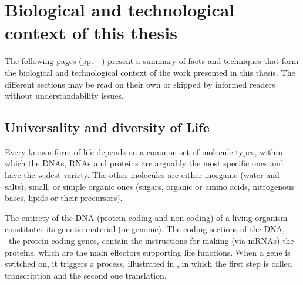 \chapter{Biological and technological context of this thesis}%
\label{ch:background}

\setlength{\epigraphwidth}{0.9\textwidth}
\setlength{\epigraphrule}{0pt}

\vspace{-1mm}
The following pages (pp.~\pageref{sec:bio}--\pageref{sec:bgConcl})
present a summary of facts and techniques
that form the biological and technological context
of the work presented in this thesis.
The different sections may be read on their own
or skipped by informed readers without understandability issues.\mybr\

\vspace{-2mm}
\section{Universality and diversity of Life}\label{sec:bio}
\vspace{-2mm}

Every known form of life depends on a common set of molecule types,
within which the \glspl{DNA}, \glspl{RNA} and proteins
are arguably the most specific ones and have the widest variety.
The other molecules are either inorganic (water and salts),
small, or simple organic ones (sugars, organic or amino acids,
nitrogenous bases, lipids or their precursors).~\mybr\

The entirety of the \gls{DNA} (protein-coding and non-coding) of a living organism
constitutes its genetic material (or genome).
The coding sections of the \gls{DNA}, \ie\ the protein-coding genes,
contain the instructions for making (via \glspl{mRNA}) the proteins,
which are the main effectors supporting life functions.
When a gene is switched on,
it triggers a process,
illustrated in ,
in which the first step is called transcription
and the second one translation.~\mybr\

